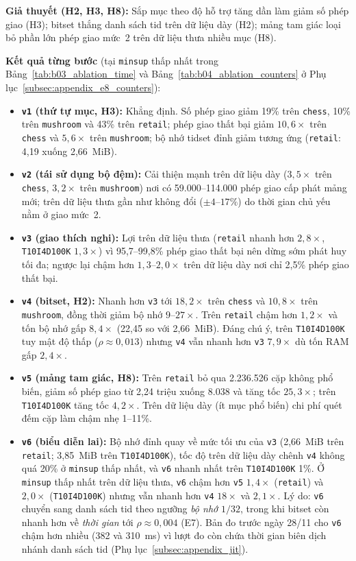 \textbf{Giả thuyết (H2, H3, H8):} Sắp mục theo độ hỗ trợ tăng dần làm giảm số phép giao (H3); bitset thắng danh sách tid trên dữ liệu dày (H2); mảng tam giác loại bỏ phần lớn phép giao mức~2 trên dữ liệu thưa nhiều mục (H8).

\textbf{Kết quả từng bước} (tại \texttt{minsup} thấp nhất trong Bảng~\ref{tab:b03_ablation_time} và Bảng~\ref{tab:b04_ablation_counters} ở Phụ lục~\ref{subsec:appendix_e8_counters}):
\begin{itemize}
    \item \textbf{\texttt{v1} (thứ tự mục, H3):} Khẳng định. Số phép giao giảm 19\% trên \texttt{chess}, 10\% trên \texttt{mushroom} và 43\% trên \texttt{retail}; phép giao thất bại giảm $10{,}6\times$ trên \texttt{chess} và $5{,}6\times$ trên \texttt{mushroom}; bộ nhớ tidset đỉnh giảm tương ứng (\texttt{retail}: 4,19 xuống 2,66~MiB).
    \item \textbf{\texttt{v2} (tái sử dụng bộ đệm):} Cải thiện mạnh trên dữ liệu dày ($3{,}5\times$ trên \texttt{chess}, $3{,}2\times$ trên \texttt{mushroom}) nơi có 59.000--114.000 phép giao cấp phát mảng mới; trên dữ liệu thưa gần như không đổi ($\pm 4$--$17\%$) do thời gian chủ yếu nằm ở giao mức~2.
    \item \textbf{\texttt{v3} (giao thích nghi):} Lợi trên dữ liệu thưa (\texttt{retail} nhanh hơn $2{,}8\times$, \texttt{T10I4D100K} $1{,}3\times$) vì 95{,}7--99{,}8\% phép giao thất bại nên dừng sớm phát huy tối đa; ngược lại chậm hơn $1{,}3$--$2{,}0\times$ trên dữ liệu dày nơi chỉ 2,5\% phép giao thất bại.
    \item \textbf{\texttt{v4} (bitset, H2):} Nhanh hơn \texttt{v3} tới $18{,}2\times$ trên \texttt{chess} và $10{,}8\times$ trên \texttt{mushroom}, đồng thời giảm bộ nhớ $9$--$27\times$. Trên \texttt{retail} chậm hơn $1{,}2\times$ và tốn bộ nhớ gấp $8{,}4\times$ (22,45 so với 2,66~MiB). Đáng chú ý, trên \texttt{T10I4D100K} tuy mật độ thấp ($\rho \approx 0{,}013$) nhưng \texttt{v4} vẫn nhanh hơn \texttt{v3} $7{,}9\times$ dù tốn RAM gấp $2{,}4\times$.
    \item \textbf{\texttt{v5} (mảng tam giác, H8):} Trên \texttt{retail} bỏ qua 2.236.526 cặp không phổ biến, giảm số phép giao từ 2,24 triệu xuống 8.038 và tăng tốc $25{,}3\times$; trên \texttt{T10I4D100K} tăng tốc $4{,}2\times$. Trên dữ liệu dày (ít mục phổ biến) chi phí quét đếm cặp làm chậm nhẹ 1--11\%.
    \item \textbf{\texttt{v6} (biểu diễn lai):} Bộ nhớ đỉnh quay về mức tối ưu của \texttt{v3} (2,66~MiB trên \texttt{retail}; 3,85~MiB trên \texttt{T10I4D100K}), tốc độ trên dữ liệu dày chênh \texttt{v4} không quá 20\% ở \texttt{minsup} thấp nhất, và \texttt{v6} nhanh nhất trên \texttt{T10I4D100K} 1\%. Ở \texttt{minsup} thấp nhất trên dữ liệu thưa, \texttt{v6} chậm hơn \texttt{v5} $1{,}4\times$ (\texttt{retail}) và $2{,}0\times$ (\texttt{T10I4D100K}) nhưng vẫn nhanh hơn \texttt{v4} $18\times$ và $2{,}1\times$. Lý do: \texttt{v6} chuyển sang danh sách tid theo ngưỡng \emph{bộ nhớ} $1/32$, trong khi bitset còn nhanh hơn về \emph{thời gian} tới $\rho \approx 0{,}004$ (E7). Bản đo trước ngày 28/11 cho \texttt{v6} chậm hơn nhiều (382 và 310~ms) vì lượt đo còn chứa thời gian biên dịch nhánh danh sách tid (Phụ lục~\ref{subsec:appendix_jit}).

\end{itemize}
